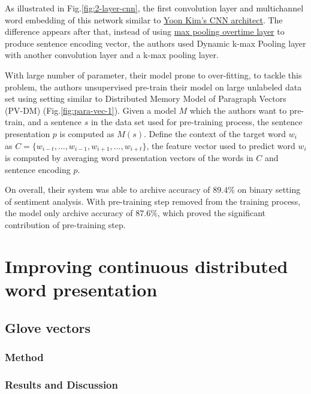 As illustrated in Fig.\ref{fig:2-layer-cnn}, the first convolution layer and multichannel word embedding of this network similar to \hyperref[kim-cnn]{Yoon Kim's CNN architect}.
The difference appears after that, instead of using  \hyperref[sec:max-overtime-pooling]{max pooling overtime layer} to produce sentence encoding vector, the authors used Dynamic k-max Pooling\cite{deep-cnn-2014} layer with another convolution layer and a k-max pooling layer\cite{deep-cnn-2014}. 

With large number of parameter, their model prone to over-fitting, to tackle this problem, the authors unsupervised pre-train their model on large unlabeled data set using setting similar to Distributed Memory Model of Paragraph Vectors (PV-DM)\cite{ParagraphVec} (Fig.\ref{fig:para-vec-1}).
Given a model \(M\) which the authors want to pre-train, and a sentence \(s\) in the data set used for pre-training process, the sentence presentation \(p\) is computed as \(M(s)\). 
Define the context of the target word \(w_i\) as \(C = \{w_{i-t},\ldots,w_{i-1}, w_{i+1},\ldots,w_{i+t}\}\), the feature vector used to predict word \(w_i\) is computed by averaging word presentation vectors of the words in \(C\) and sentence encoding \(p\)\cite{2-layer-cnn}.
 
On overall, their system was able to archive accuracy of \(89.4\%\) on binary setting of sentiment analysis. 
With pre-training step removed from the training process, the model only archive accuracy of \(87.6\%\), which proved the significant contribution of pre-training step.\cite{2-layer-cnn}



\section{Improving continuous distributed word presentation}

\subsection{Glove vectors}
\subsubsection{Method}

\subsubsection{Results and Discussion}

